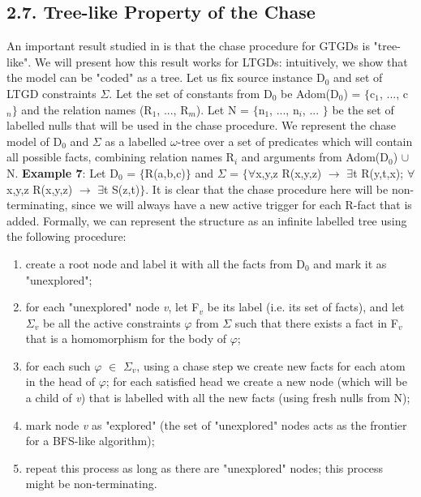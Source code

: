 \documentclass[11pt, a4paper, dvipsnames]{article}
\begin{document}
\subsection{2.7. Tree-like Property of the Chase}
An important result studied in \cite{decidable} is that the chase procedure for GTGDs is "tree-like". We will present how this result works for LTGDs: 
intuitively, we show that the model can be "coded" as a tree.\newline
Let us fix source instance D$_{0}$ and set of LTGD constraints $\Sigma$. Let the set of constants from D$_{0}$ be Adom(D$_{0}$) = $\{$c$_{1}$, ..., c$_{n}\}$ and the relation names (R$_{1}$, ..., R$_{m}$). Let N = $\{$n$_{1}$, ..., n$_{i}$, ... $\}$ be the set of labelled nulls that will be used in the chase procedure. We represent the chase model of D$_{0}$ and $\Sigma$ as a labelled $\omega$-tree over a set of predicates which will contain all possible facts, combining relation names R$_{i}$ and arguments from Adom(D$_{0}$) $\cup$ N.\newline
\textbf{Example 7}: Let D$_{0}$ = $\{$R(a,b,c)$\}$ and $\Sigma$ = $\{\forall$x,y,z R(x,y,z) $\rightarrow$ $\exists$t R(y,t,x); $\forall$x,y,z R(x,y,z) $\rightarrow$ $\exists$t S(z,t)$\}$. It is clear that the chase procedure here will be non-terminating, since we will always have a new active trigger for each R-fact that is added.\newline 
Formally, we can represent the structure as an infinite labelled tree using the following procedure:
\begin{enumerate}
	\item create a root node and label it with all the facts from D$_{0}$ and mark it as "unexplored";
	\item for each "unexplored" node \textit{v}, let F$_{v}$ be its label (i.e. its set of facts), and let $\Sigma_{v}$ be all the active constraints $\varphi$ from $\Sigma$ such that there exists a fact in F$_{v}$ that is a homomorphism for the body of $\varphi$;
	\item for each such $\varphi$ $\in$ $\Sigma_{v}$, using a chase step we create new facts for each atom in the head of $\varphi$; for each satisfied head we create a new node (which will be a child of \textit{v}) that is labelled with all the new facts (using fresh nulls from N);
	\item mark node \textit{v} as "explored" (the set of "unexplored" nodes acts as the frontier for a BFS-like algorithm);
	\item repeat this process as long as there are "unexplored" nodes; this process might be non-terminating.
\end{enumerate}
\end{document}
